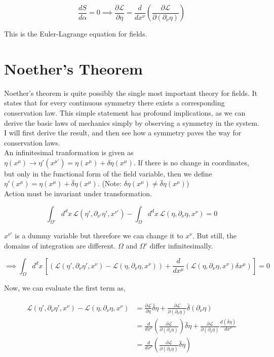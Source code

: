 $$\frac{dS}{d\alpha}=0\implies \frac{\partial\mathcal{L}}{\partial\eta}=\frac{d}{dx^\nu}\left(\frac{\partial\mathcal{L}}{\partial(\partial_\nu \eta)}\right)$$

\noindent This is the Euler-Lagrange equation for fields.

\section{Noether's Theorem}
Noether's theorem is quite possibly the single most important theory for fields. It states that for every continuous symmetry there exists a corresponding conservation law. This simple statement has profound implications, as we can derive the basic laws of mechanics simply by observing a symmetry in the system. I will first derive the result, and then see how a symmetry paves the way for conservation laws.\\

\noindent An infinitesimal tranformation is given as $\eta(x^\mu)\rightarrow\eta'(x^{\mu'})=\eta(x^\mu)+\delta\eta(x^\mu)$. If there is no change in coordinates, but only in the functional form of the field variable, then we define $\eta'(x^{\mu})=\eta(x^\mu)+\bar\delta\eta(x^\mu)$. (Note: $\delta\eta(x^\mu) \neq \bar\delta\eta(x^\mu)$)\\

\noindent Action must be invariant under transformation.

$$\int_{\Omega'}d^dx\,\mathcal{L}(\eta',\partial_{\nu'}\eta',x^{\nu'})-\int_{\Omega}d^dx\,\mathcal{L}(\eta,\partial_\nu\eta,x^\nu)=0$$

\noindent $x^{\nu'}$ is a dummy variable but therefore we can change it to $x^\nu$. But still, the domains of integration are different. $\Omega$ and $\Omega'$ differ infinitesimally.

$$\implies\int_{\Omega}d^dx\,\left[(\mathcal{L}(\eta',\partial_\nu\eta',x^\nu)-\mathcal{L}(\eta,\partial_\nu\eta,x^\nu))+\frac{d}{dx^\mu}(\mathcal{L}(\eta,\partial_\nu\eta,x^\nu)\delta x^\mu)\right]=0$$

\noindent Now, we can evaluate the first term as,

\begin{align*}
    \begin{split}
        \mathcal{L}(\eta',\partial_\nu\eta',x^\nu)-\mathcal{L}(\eta,\partial_\nu\eta,x^\nu)&=\frac{\partial\mathcal{L}}{\partial\eta}\bar\delta\eta+\frac{\partial\mathcal{L}}{\partial(\partial_\nu\eta)} \bar\delta(\partial_\nu\eta)\\
        &=\frac{d}{dx^\nu}\left(\frac{\partial\mathcal{L}}{\partial(\partial_\nu\eta)}\right)\bar\delta\eta+\frac{\partial\mathcal{L}}{\partial(\partial_\nu\eta)}\frac{d(\bar\delta\eta)}{dx^\nu}\\
        &=\frac{d}{dx^\nu}\left(\frac{\partial\mathcal{L}}{\partial(\partial_\nu\eta)}\bar\delta\eta\right)
    \end{split}
\end{align*}

